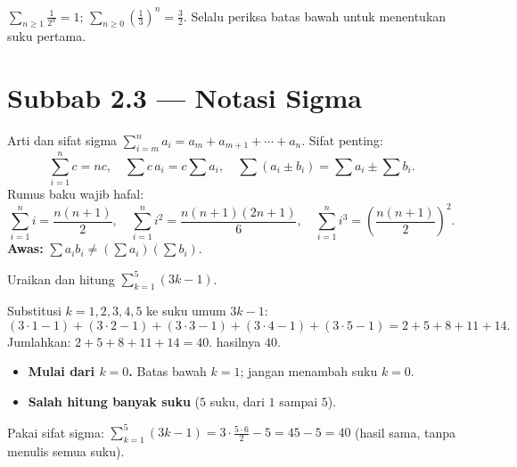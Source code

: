 \begin{variasi}
$\sum_{n\ge1}\frac{1}{2^n}=1$; $\sum_{n\ge0}\left(\frac13\right)^n=\frac32$.
Selalu periksa batas bawah untuk menentukan suku pertama.
\end{variasi}

\section*{Subbab 2.3 — Notasi Sigma}

\begin{ingat}{Arti dan sifat sigma}
$\displaystyle\sum_{i=m}^{n}a_i=a_m+a_{m+1}+\cdots+a_n$. Sifat penting:
\[
\sum_{i=1}^{n}c=nc,\quad \sum c\,a_i=c\sum a_i,\quad \sum(a_i\pm b_i)=\sum a_i\pm\sum b_i.
\]
Rumus baku wajib hafal:
\[
\sum_{i=1}^{n}i=\frac{n(n+1)}{2},\quad
\sum_{i=1}^{n}i^2=\frac{n(n+1)(2n+1)}{6},\quad
\sum_{i=1}^{n}i^3=\left(\frac{n(n+1)}{2}\right)^2.
\]
\textbf{Awas:} $\sum a_ib_i\neq(\sum a_i)(\sum b_i)$.
\end{ingat}

\begin{soalbox}{}
Uraikan dan hitung $\displaystyle\sum_{k=1}^{5}(3k-1)$.
\end{soalbox}

\jawab
{} Substitusi $k=1,2,3,4,5$ ke suku umum $3k-1$:
\[
(3\cdot1{-}1)+(3\cdot2{-}1)+(3\cdot3{-}1)+(3\cdot4{-}1)+(3\cdot5{-}1)
=2+5+8+11+14.
\]
 Jumlahkan: $2+5+8+11+14=40$.
\jadi hasilnya $40$.

\begin{jebakan}
\begin{itemize}[leftmargin=*,topsep=2pt]
  \item \textbf{Mulai dari $k=0$.} Batas bawah $k=1$; jangan menambah suku
  $k=0$.
  \item \textbf{Salah hitung banyak suku} ($5$ suku, dari $1$ sampai $5$).
\end{itemize}
\end{jebakan}

\begin{variasi}
Pakai sifat sigma: $\sum_{k=1}^{5}(3k-1)=3\cdot\frac{5\cdot6}{2}-5=45-5=40$
(hasil sama, tanpa menulis semua suku).
\end{variasi}

